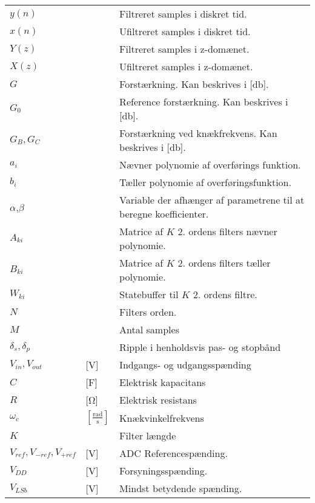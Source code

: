 \begin{table}[h!]
\begin{threeparttable}
\begin{tabular}{l l l}
$y(n)$\tnote{*}	    &		            & Filtreret samples i diskret tid.	\\
$x(n)$\tnote{*}	    &		            & Ufiltreret samples i diskret tid.	\\
$Y(z)$\tnote{*}	    &		            & Filtreret samples i z-domænet.	\\
$X(z)$\tnote{*}	    &		            & Ufiltreret samples i  z-domænet.	\\
$G$\tnote{*}		&   				& Forstærkning. Kan beskrives i [\si{\decibel}].\\
$G_0$\tnote{*}		&   				& Reference forstærkning. Kan beskrives i [\si{\decibel}].\\
$G_B,G_C$\tnote{*}	&   				& Forstærkning ved knækfrekvens. Kan beskrives i [\si{\decibel}].\\
$a_i$\tnote{*}	    &   				& Nævner polynomie af overførings funktion.\\
$b_i$ \tnote{*}	    &   				& Tæller polynomie af overføringsfunktion.\\
$\alpha$\tnote{*},$\beta$\tnote{*}	    &   			& Variable der afhænger af parametrene til at beregne koefficienter.\\
$A_{ki}$\tnote{*}	    &   			& Matrice af $K$ 2. ordens filters nævner polynomie.\\
$B_{ki}$\tnote{*}	    &   			& Matrice af $K$ 2. ordens filters tæller polynomie.\\
$W_{ki}$\tnote{*}	    &   			& Statebuffer til $K$ 2. ordens filtre.\\
$N$\tnote{*}        &                   & Filters orden.\\
$M$\tnote{*}        &                   & Antal samples \\   
$\delta_s, \delta_p$\tnote{*}	&   				& Ripple i henholdsvis pas- og stopbånd\\
$V_{in},V_{out}$ & [\si{\volt}] & Indgangs- og udgangsspænding\\
$C$ & [\si{\farad}] & Elektrisk kapacitans \\
$R$ & [\si{\ohm}] & Elektrisk resistans \\
$\omega _c$ & $[\frac{\si{\radian}}{\si{\second}}]$ & Knækvinkelfrekvens \\
$K$ & & Filter længde\\
$V_{ref},V_{-ref},V_{+ref}$ & [\si{\volt}] & ADC Referencespænding. \\
$V_{DD}$ & [\si{\volt}] & Forsyningsspænding. \\
$V_{LSb}$ & [\si{\volt}] & Mindst betydende spænding. \\

\end{tabular}
\end{threeparttable}
\end{table}
